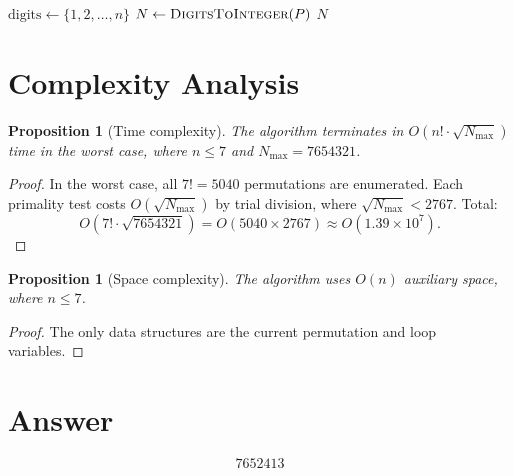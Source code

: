 \documentclass[12pt]{article}
\newtheorem{proposition}[theorem]{Proposition}
\begin{document}
\begin{algorithm}[H]
\caption{Largest Pandigital Prime}
\begin{algorithmic}[1]
 
    \State $\text{digits} \gets \{1, 2, \ldots, n\}$
        \State $N \gets \textsc{DigitsToInteger}(P)$
            \State \Return $N$
        \EndIf
    \EndFor
\EndFor
\end{algorithmic}
\end{algorithm}

\section{Complexity Analysis}

\begin{proposition}[Time complexity]
The algorithm terminates in $O(n! \cdot \sqrt{N_{\max}})$ time in the worst case, where $n \leq 7$ and $N_{\max} = 7654321$.
\end{proposition}

\begin{proof}
In the worst case, all $7! = 5040$ permutations are enumerated. Each primality test costs $O(\sqrt{N_{\max}})$ by trial division, where $\sqrt{N_{\max}} < 2767$. Total:
\[
O(7! \cdot \sqrt{7654321}) = O(5040 \times 2767) \approx O(1.39 \times 10^7).
\]
\end{proof}

\begin{proposition}[Space complexity]
The algorithm uses $O(n)$ auxiliary space, where $n \leq 7$.
\end{proposition}

\begin{proof}
The only data structures are the current permutation and loop variables.
\end{proof}

\section{Answer}

\[
\boxed{7652413}
\]
\end{document}
